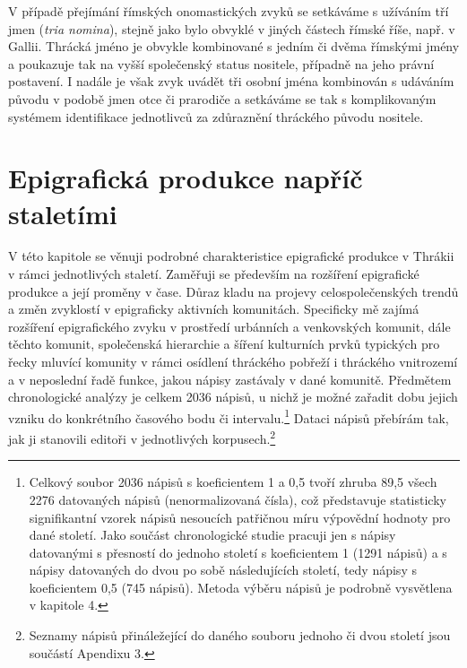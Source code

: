 V případě přejímání římských onomastických zvyků se setkáváme s užíváním tří jmen ({\em tria nomina}), stejně jako bylo obvyklé v jiných částech římské říše, např. v Gallii. Thrácká jméno je obvykle kombinované s jedním či dvěma římskými jmény a poukazuje tak na vyšší společenský status nositele, případně na jeho právní postavení. I nadále je však zvyk uvádět tři osobní jména kombinován s udáváním původu v podobě jmen otce či prarodiče a setkáváme se tak s komplikovaným systémem identifikace jednotlivců za zdůraznění thráckého původu nositele.

\chapter{Epigrafická produkce napříč staletími}
V této kapitole se věnuji podrobné charakteristice epigrafické produkce v Thrákii v rámci jednotlivých staletí. Zaměřuji se především na rozšíření epigrafické produkce a její proměny v čase. Důraz kladu na projevy celospolečenských trendů a změn zvyklostí v epigraficky aktivních komunitách. Specificky mě zajímá rozšíření epigrafického zvyku v prostředí urbánních a venkovských komunit, dále těchto komunit, společenská hierarchie a šíření kulturních prvků typických pro řecky mluvící komunity v rámci osídlení thráckého pobřeží i thráckého vnitrozemí a v neposlední řadě funkce, jakou nápisy zastávaly v dané komunitě. Předmětem chronologické analýzy je celkem 2036 nápisů, u nichž je možné zařadit dobu jejich vzniku do konkrétního časového bodu či intervalu.\footnote{Celkový soubor 2036 nápisů s koeficientem 1 a 0,5 tvoří zhruba 89,5  všech 2276 datovaných nápisů (nenormalizovaná čísla), což představuje statisticky signifikantní vzorek nápisů nesoucích patřičnou míru výpovědní hodnoty pro dané století. Jako součást chronologické studie pracuji jen s nápisy datovanými s přesností do jednoho století s koeficientem 1 (1291 nápisů) a s nápisy datovaných do dvou po sobě následujících století, tedy nápisy s koeficientem 0,5 (745 nápisů). Metoda výběru nápisů je podrobně vysvětlena v kapitole 4.} Dataci nápisů přebírám tak, jak ji stanovili editoři v jednotlivých korpusech.\footnote{Seznamy nápisů přináležející do daného souboru jednoho či dvou století jsou součástí Apendixu 3.}

